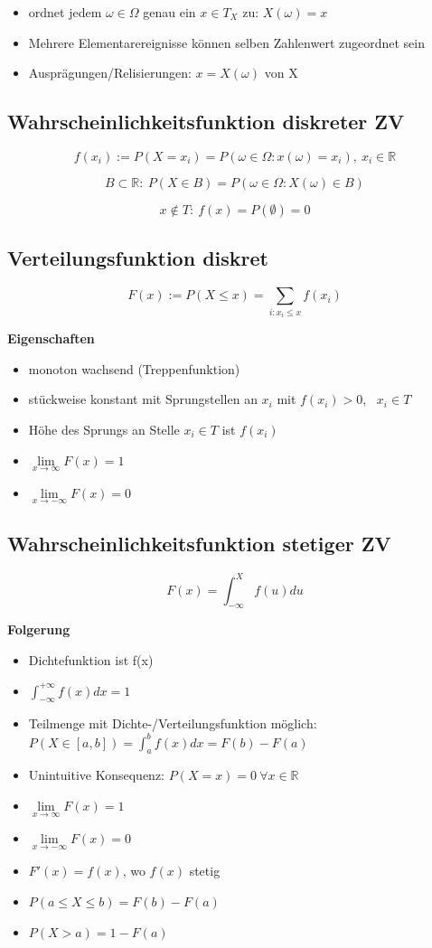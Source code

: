 \documentclass[10pt,a4paper,landscape]{article}
\begin{document}
\begin{multicols}{4}
\begin{itemize}
\item ordnet jedem $\omega \in \Omega$ genau ein $x \in T_X$ zu: $X(\omega)=x$
\item Mehrere Elementarereignisse können selben Zahlenwert zugeordnet sein
\item Ausprägungen/Relisierungen: $x=X(\omega)$ von X
\end{itemize}

\subsection{Wahrscheinlichkeitsfunktion diskreter ZV}
\[
f(x_i):=P(X=x_i)=P({\omega \in \Omega : x(\omega)=x_i}), ~ x_i \in \mathbb{R}
\]

\[
B\subset \mathbb{R}: ~ P(X \in B) = P({\omega \in \Omega : X(\omega) \in B})
\]

\[
x \notin T: ~ f(x)=P(\emptyset)=0
\]

\subsection{Verteilungsfunktion diskret}
\[
F(x) := P(X\leqslant x) = \sum_{i:x_i\leqslant x} f(x_i)
\]

\textbf{Eigenschaften}
\begin{itemize}
\item monoton wachsend (\glqq Treppenfunktion\grqq)
\item stückweise konstant mit Sprungstellen an $x_i$ mit $f(x_i) > 0$, ~$x_i \in T$
\item Höhe des Sprungs an Stelle $x_i \in T$ ist $f(x_i)$
\item $\lim\limits_{x \to \infty} F(x) = 1$
\item $\lim\limits_{x \to -\infty} F(x)=0$
\end{itemize}

\subsection{Wahrscheinlichkeitsfunktion stetiger ZV}
\[
F(x)=\int_{-\infty}^{X}f(u)du
\]

\textbf{Folgerung}
\begin{itemize}
\item Dichtefunktion ist f(x)
\item $\int_{- \infty}^{+\infty} f(x)dx =1$
\item Teilmenge mit Dichte-/Verteilungsfunktion möglich: $P(X \in [a,b])=\int_a^b f(x)dx= F(b) -F(a)$
\item Unintuitive Konsequenz: $P(X=x)=0 ~\forall x \in \mathbb{R}$
\item $\lim\limits_{x \to \infty} F(x) = 1$
\item $\lim\limits_{x \to -\infty} F(x)=0$
\item $F'(x)=f(x)$, wo $f(x)$ stetig
\item $P(a \leqslant X \leqslant b)=F(b)-F(a)$
\item $P(X>a)= 1-F(a)$
\end{itemize}


\end{multicols}
\end{document}
